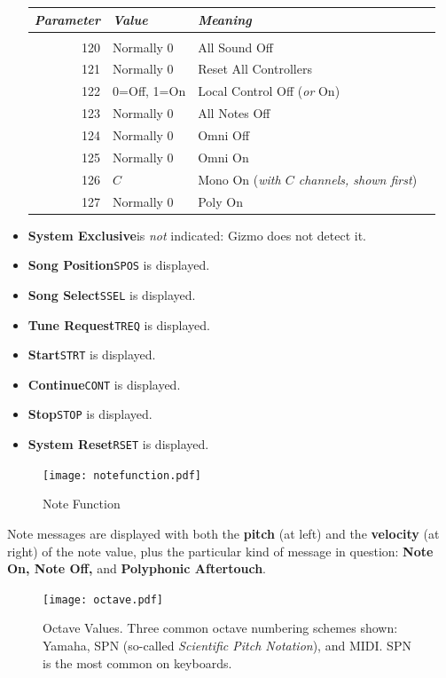 \documentclass{article}
\begin{document}
\begin{itemize}
\begin{center}
\begin{tabular}{@{}rlll@{}}
{\it Parameter}&{\it Value}&{\it Meaning}\\[0.1em]
\hline\\[-0.9em]
120&Normally 0&All Sound Off\\
121&Normally 0&Reset All Controllers\\
122&0=Off, 1=On&Local Control Off ({\it or} On)\\
123&Normally 0&All Notes Off\\
124&Normally 0&Omni Off\\
125&Normally 0&Omni On\\
126&\(C\)&Mono On ({\it with \(C\) channels, shown first})\\
127&Normally 0&Poly On\\
\end{tabular}\end{center}
\item {\bf System Exclusive}\quad is {\it not} indicated: Gizmo does not detect it.
\item {\bf Song Position}\quad \texttt{SPOS} is displayed.
\item {\bf Song Select}\quad \texttt{SSEL} is displayed.
\item {\bf Tune Request}\quad \texttt{TREQ} is displayed.
\item {\bf Start}\quad \texttt{STRT} is displayed.
\item {\bf Continue}\quad \texttt{CONT} is displayed.
\item {\bf Stop}\quad \texttt{STOP} is displayed.
\item {\bf System Reset}\quad \texttt{RSET} is displayed.
\end{itemize}


\begin{figure}
\vspace{-37em}\texttt{[image: notefunction.pdf]}
\vspace{-2em}\caption{\small Note Function}
\label{notefunction}
\end{figure}


Note messages are displayed with both the {\bf pitch} (at left) and the {\bf velocity} (at right) of the note value, plus the particular kind of message in question: {\bf Note On, Note Off,} and {\bf Polyphonic Aftertouch}.

\begin{figure}
\vspace{-32em}
\texttt{[image: octave.pdf]}
\vspace{-2em}\caption{\small Octave Values.  Three common octave numbering schemes shown: Yamaha, SPN (so-called {\it Scientific Pitch Notation}), and MIDI.  SPN is the most common on keyboards.}\vspace{-5em}
\label{octave}
\end{figure}
\end{document}
